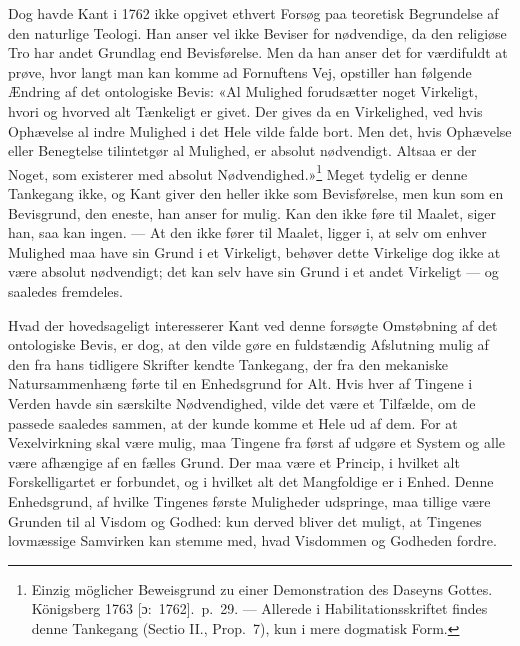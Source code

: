\documentclass[12pt,a4paper]{article}
\newcommand{\apage}[1]{\marginnote{\footnotesize\textit{[#1]}}}
\begin{document}
Dog havde Kant i 1762 ikke opgivet ethvert Forsøg paa teoretisk
Begrundelse af den naturlige Teologi. Han anser vel ikke Beviser for
nødvendige, da den religiøse Tro har andet Grundlag end Bevisførelse. Men
da han anser det for værdifuldt at prøve, hvor langt man kan komme ad
Fornuftens Vej, opstiller han følgende Ændring af det ontologiske Bevis:
«Al Mulighed forudsætter noget Virkeligt, hvori og hvorved alt Tænkeligt
er givet. Der gives da en Virkelighed, ved hvis Ophævelse al indre
Mulighed i det Hele vilde falde bort. Men det, hvis Ophævelse eller
Benegtelse tilintetgør al Mulighed, er absolut nødvendigt. Altsaa er der
Noget, som existerer med absolut Nødvendighed.»\footnote{Einzig
möglicher Beweisgrund zu einer Demonstration des Daseyns Gottes.
Königsberg 1763 [ɔ:\ 1762].\ p.\ 29. --- Allerede i Habilitationsskriftet
findes denne Tankegang (Sectio II., Prop.\ 7), kun i mere dogmatisk Form.}
Meget tydelig er denne Tankegang ikke, og Kant giver den heller ikke som
Bevisførelse, men kun som en Bevisgrund, den eneste, han anser for mulig.
Kan den ikke føre til Maalet, siger han, saa kan ingen. --- At den ikke
fører til Maalet, ligger i, at selv om enhver Mulighed maa have sin Grund
i et Virkeligt, behøver dette Virkelige dog ikke at være absolut
nødvendigt; det kan selv have sin Grund i et andet Virkeligt --- og
saaledes fremdeles.

Hvad der hovedsageligt interesserer Kant ved denne forsøgte Omstøbning af
det ontologiske Bevis, er dog, at den vilde gøre en fuldstændig Afslutning
mulig af den fra hans tidligere Skrifter kendte Tankegang, der fra den
mekaniske Natursammenhæng førte til en Enhedsgrund for Alt. Hvis hver af
Tingene i Verden havde sin særskilte Nødvendighed, vilde det være et
Tilfælde, om de passede saaledes sammen, at der kunde komme et Hele ud af
dem. For at Vexelvirkning skal være mulig, maa Tingene fra først \apage{13}  af
udgøre et System og alle være afhængige af en fælles Grund. Der maa være
et Princip, i hvilket alt Forskelligartet er forbundet, og i hvilket alt
det Mangfoldige er i Enhed. Denne Enhedsgrund, af hvilke Tingenes første
Muligheder udspringe, maa tillige være Grunden til al Visdom og Godhed:
kun derved bliver det muligt, at Tingenes lovmæssige Samvirken kan stemme
med, hvad Visdommen og Godheden fordre.
\end{document}
